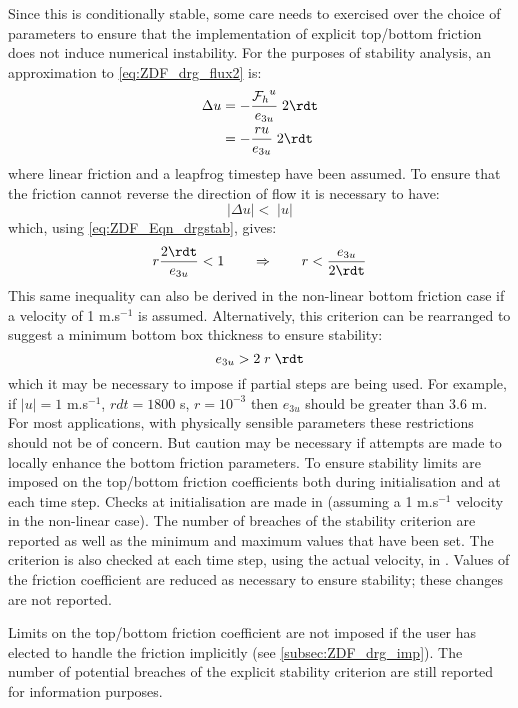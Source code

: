 \documentclass[../main/NEMO_manual]{subfiles}
\begin{document}
Since this is conditionally stable, some care needs to exercised over the choice of parameters to ensure that the implementation of explicit top/bottom friction does not induce numerical instability.
For the purposes of stability analysis, an approximation to \autoref{eq:ZDF_drg_flux2} is:
\begin{equation}
  \label{eq:ZDF_Eqn_drgstab}
  \begin{split}
    \Delta u &= -\frac{{{\cal F}_h}^u}{e_{3u}}\;2 \rdt    \\
    &= -\frac{ru}{e_{3u}}\;2\rdt\\
  \end{split}
\end{equation}
\noindent where linear friction and a leapfrog timestep have been assumed.
To ensure that the friction cannot reverse the direction of flow it is necessary to have:
\[
  |\Delta u| < \;|u|
\]
\noindent which, using \autoref{eq:ZDF_Eqn_drgstab}, gives:
\[
  r\frac{2\rdt}{e_{3u}} < 1 \qquad  \Rightarrow \qquad r < \frac{e_{3u}}{2\rdt}\\
\]
This same inequality can also be derived in the non-linear bottom friction case if
a velocity of 1 m.s$^{-1}$ is assumed.
Alternatively, this criterion can be rearranged to suggest a minimum bottom box thickness to ensure stability:
\[
  e_{3u} > 2\;r\;\rdt
\]
\noindent which it may be necessary to impose if partial steps are being used.
For example, if $|u| = 1$ m.s$^{-1}$, $rdt = 1800$ s, $r = 10^{-3}$ then $e_{3u}$ should be greater than 3.6 m.
For most applications, with physically sensible parameters these restrictions should not be of concern.
But caution may be necessary if attempts are made to locally enhance the bottom friction parameters.
To ensure stability limits are imposed on the top/bottom friction coefficients both
during initialisation and at each time step.
Checks at initialisation are made in  (assuming a 1 m.s$^{-1}$ velocity in the non-linear case).
The number of breaches of the stability criterion are reported as well as
the minimum and maximum values that have been set.
The criterion is also checked at each time step, using the actual velocity, in .
Values of the friction coefficient are reduced as necessary to ensure stability;
these changes are not reported.

Limits on the top/bottom friction coefficient are not imposed if the user has elected to
handle the friction implicitly (see \autoref{subsec:ZDF_drg_imp}).
The number of potential breaches of the explicit stability criterion are still reported for information purposes.
\end{document}
